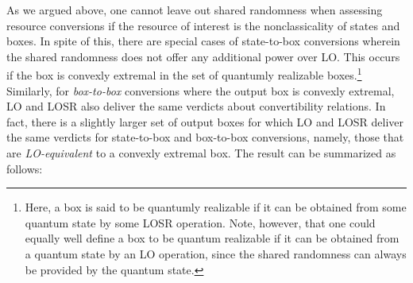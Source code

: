 \documentclass[prx,11pt,letterpaper,twocolumn,accepted=2023-11-27]{quantumarticle}
\theoremstyle{plain}
\theoremstyle{definition}
\begin{document}
As we argued above, one cannot leave out shared randomness when assessing resource conversions
 if the resource of interest is the 
 nonclassicality of states and boxes.  In spite of this, there are special cases of state-to-box  conversions wherein the shared randomness does not offer any additional power over LO.  This occurs if the box is convexly extremal in the set of quantumly realizable boxes.\footnote{Here, a box is said to be quantumly realizable if it can be obtained from some quantum state by some LOSR operation. Note, however, that one could equally well define a box to be quantum realizable if it can be obtained from a quantum state by an LO operation, since the shared randomness can always be provided by the quantum state.}
 Similarly, for {\em box-to-box} conversions where the output box is convexly extremal,  LO and LOSR also deliver the same verdicts about convertibility relations. In fact, there is a slightly larger set of output boxes for which LO and LOSR deliver the same verdicts for state-to-box and box-to-box conversions, namely, those that are {\em LO-equivalent} to a convexly extremal box. The result can be summarized as follows:
 
\end{document}
